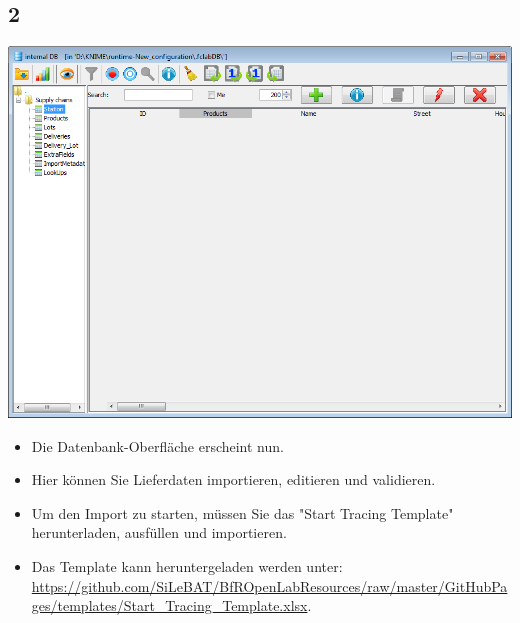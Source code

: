 \documentclass{beamer}
\begin{document}
\subsection{2}
\begin{frame}
	\begin{center}
  		\includegraphics[height=0.45\textheight]{2.png}
	\end{center}
	\begin{itemize}
		\item Die Datenbank-Oberfläche erscheint nun.
		\item Hier können Sie Lieferdaten importieren, editieren und validieren.
		\item Um den Import zu starten, müssen Sie das "Start Tracing Template" herunterladen, ausfüllen und importieren.
		\item Das Template kann heruntergeladen werden unter: \url{https://github.com/SiLeBAT/BfROpenLabResources/raw/master/GitHubPages/templates/Start_Tracing_Template.xlsx}.
	\end{itemize}
\end{frame}
\end{document}

